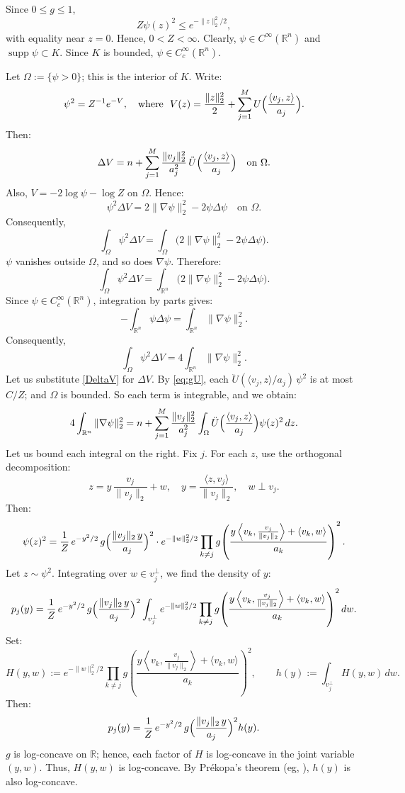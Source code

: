 \documentclass[12pt,reqno]{amsart}
\makeatletter
\renewenvironment{proof}[1][\proofname]{%
  \par\vspace{\topsep}%
  \normalfont\topsep6\p@\@plus6\p@\relax
  \trivlist
  \item[\hskip\labelsep\itshape #1\@addpunct{.}]\ignorespaces
}{%
  \endtrivlist
}
\numberwithin{equation}{section}
\def \R {\mathbb{R}}
\makeatother
\begin{document}
\begin{proof}
Since \(0 \le g \le 1\), 
\[
Z\psi(z)^2\le e^{-\|z\|_2^2/2},
\]
with equality near \(z=0\). Hence, \(0<Z<\infty\). Clearly, \(\psi\in C^\infty(\R^n)\) and \(\operatorname{supp}\psi\subset K\). Since \(K\) is bounded, \(\psi\in C_c^\infty(\R^n)\).
\smallskip%

Let \(\Omega:=\{\psi>0\}\); this is the interior of \(K\). Write:
\[
\psi^2=Z^{-1}e^{-V},\quad
\text{where }\ V(z)=\frac{\|z\|_2^2}{2}+\sum_{j=1}^M U\Bigl(\frac{\langle v_j,z\rangle}{a_j}\Bigr).
\]
Then:
\begin{equation}\label{DeltaV}
\Delta V=n+\sum_{j=1}^M\frac{\|v_j\|_2^2}{a_j^2}\,\ddot U\Bigl(\frac{\langle v_j,z\rangle}{a_j}\Bigr)\quad\text{on }\Omega.
\end{equation}
Also, \(V=-2\log\psi-\log Z\) on \(\Omega\). Hence:
\[
\psi^2\Delta V=2\|\nabla\psi\|_2^2-2\psi\Delta\psi\quad\text{on }\Omega.
\]
Consequently,
\[
\int_\Omega\psi^2\Delta V=
\int_\Omega\bigl(2\|\nabla\psi\|_2^2-2\psi\Delta\psi\bigr).
\]
\(\psi\) vanishes outside \(\Omega\), and so does 
\(\nabla\psi\). Therefore:
\[
\int_\Omega\psi^2\Delta V=
\int_{\R^n}\bigl(2\|\nabla\psi\|_2^2-2\psi\Delta\psi\bigr).
\]
Since \(\psi\in C_c^\infty(\R^n)\), integration by parts gives:
\[
-\int_{\R^n}\psi\Delta\psi=\int_{\R^n}\|\nabla\psi\|_2^2.
\]
Consequently,
\[
\int_\Omega\psi^2\Delta V=4\int_{\R^n}\|\nabla\psi\|_2^2.
\]
Let us substitute \eqref{DeltaV} for \(\Delta V\). 
By \eqref{eq:gU}, each \(\ddot U(\langle v_j,z\rangle/a_j)\,\psi^2\) is at most \(C/Z\); and \(\Omega\) is bounded. So each term is integrable, and we obtain:
\begin{equation}\label{eq:energy-sum}
4\int_{\R^n}\|\nabla\psi\|_2^2
=n+\sum_{j=1}^M\frac{\|v_j\|_2^2}{a_j^2}
\int_\Omega\ddot U\Bigl(\frac{\langle v_j,z\rangle}{a_j}\Bigr)\psi(z)^2\,dz.
\end{equation}
Let us bound each integral on the right. Fix \(j\). For each \(z\), use the orthogonal decomposition:
\[
z=y\,\frac{v_j}{\|v_j\|_2}+w,\quad
y=\frac{\langle z,v_j\rangle}{\|v_j\|_2},\quad w\perp v_j.
\]
Then:
\[
\psi(z)^2=
\frac1Z\,e^{-y^2/2}\,
g\Bigl(\frac{\|v_j\|_2\,y}{a_j}\Bigr)^2
\cdot
e^{-\|w\|_2^2/2}
\prod_{k\ne j}
g\!\left(
\frac{y\left\langle v_k,\frac{v_j}{\|v_j\|_2}\right\rangle+\langle v_k,w\rangle}{a_k}
\right)^2.
\]
Let \(z\sim\psi^2\). Integrating over \(w\in v_j^\perp\), we find the density of \(y\):
\[
p_j(y)
=
\frac1Z\,e^{-y^2/2}\,
g\Bigl(\frac{\|v_j\|_2\,y}{a_j}\Bigr)^2
\int_{v_j^\perp}
e^{-\|w\|_2^2/2}
\prod_{k\ne j}
g\!\left(
\frac{y\left\langle v_k,\frac{v_j}{\|v_j\|_2}\right\rangle+\langle v_k,w\rangle}{a_k}
\right)^2
dw.
\]
Set:
\[
H(y,w):=e^{-\|w\|_2^2/2}
\prod_{k\ne j}
g\!\left(
\frac{y\left\langle v_k,\frac{v_j}{\|v_j\|_2}\right\rangle+\langle v_k,w\rangle}{a_k}
\right)^2,
\qquad
h(y):=\int_{v_j^\perp}H(y,w)\,dw.
\]
Then:
\[
p_j(y)=\frac1Z\,e^{-y^2/2}\,g\Bigl(\frac{\|v_j\|_2\,y}{a_j}\Bigr)^2h(y).
\]
\(g\) is log-concave on \(\R\); hence, each factor of \(H\) is log-concave in the joint variable \((y,w)\).
Thus, \(H(y,w)\) is log-concave. By Pr\'ekopa's theorem (eg, \cite{SaumWell}), \(h(y)\) is also log-concave. 
\smallskip%
 

\end{proof}
\end{document}
